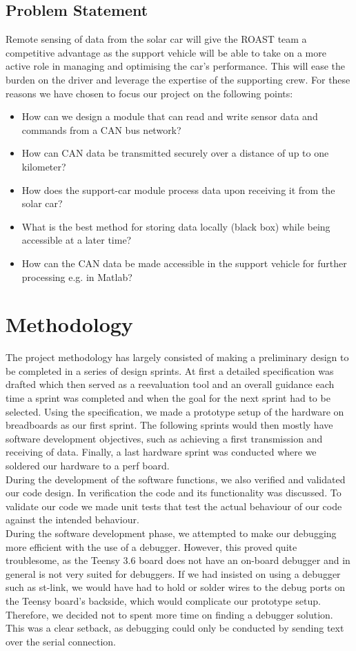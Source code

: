 \documentclass[conference]{IEEEtran}
\begin{document}
\subsection{Problem Statement}
Remote sensing of data from the solar car will give the ROAST team a competitive advantage as the support vehicle will be able to take on a more active role in managing and optimising the car's performance. This will ease the burden on the driver and leverage the expertise of the supporting crew. For these reasons we have chosen to focus our project on the following points:
\begin{itemize}
    \item How can we design a module that can read and write sensor data and commands from a CAN bus network? 
    \item How can CAN data be transmitted securely over a distance of up to one kilometer?
    \item How does the support-car module process data upon receiving it from the solar car?
    \item What is the best method for storing data locally (black box) while being accessible at a later time?
    \item How can the CAN data be made accessible in the support vehicle for further processing e.g. in Matlab?
\end{itemize}

\section{Methodology}
The project methodology has largely consisted of making a preliminary design to be completed in a series of design sprints. At first a detailed specification was drafted which then served as a reevaluation tool and an overall guidance each time a sprint was completed and when the goal for the next sprint had to be selected. Using the specification, we made a prototype setup of the hardware on breadboards as our first sprint. The following sprints would then mostly have software development objectives, such as achieving a first transmission and receiving of data. Finally, a last hardware sprint was conducted where we soldered our hardware to a perf board.\\
During the development of the software functions, we also verified and validated our code design. In verification the code and its functionality was discussed. To validate our code we made unit tests that test the actual behaviour of our code against the intended behaviour.\\
During the software development phase, we attempted to make our debugging more efficient with the use of a debugger. However, this proved quite troublesome, as the Teensy 3.6 board does not have an on-board debugger and in general is not very suited for debuggers. If we had insisted on using a debugger such as st-link, we would have had to hold or solder wires to the debug ports on the Teensy board's backside, which would complicate our prototype setup. Therefore, we decided not to spent more time on finding a debugger solution. This was a clear setback, as debugging could only be conducted by sending text over the serial connection.
\end{document}
